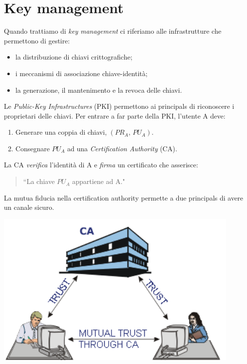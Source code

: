 \documentclass[a4paper, 11pt, twoside, openright, fleqn]{report}
\begin{document}
\chapter{Key management}
Quando trattiamo di \emph{key management} ci riferiamo alle infrastrutture che permettono di gestire:
\begin{itemize}
	\item la distribuzione di chiavi crittografiche;
	\item i meccanismi di associazione chiave-identità;
	\item la generazione, il mantenimento e la revoca delle chiavi.
\end{itemize}
Le \emph{Public-Key Infrastructures} (PKI) permettono ai principals di riconoscere i proprietari delle chiavi. Per entrare a far parte della PKI, l'utente A deve:
\begin{enumerate}
	\item Generare una coppia di chiavi, $(PR_A,\,PU_A)$.
	\item Consegnare $PU_A$ ad una \emph{Certification Authority} (CA).
\end{enumerate}
La CA \emph{verifica} l'identità di A e \emph{firma} un certificato che asserisce:
\begin{quote}
	``La chiave $PU_A$ appartiene ad A."
\end{quote}
\begin{minipage}{.62\textwidth}
	\noindent La mutua fiducia nella certification authority permette a due principals di avere un canale sicuro.
\end{minipage}
\begin{minipage}{.38\textwidth}
	\centering
	\includegraphics[width=.9\textwidth]{images/CAMutualTrust}
\end{minipage}
\end{document}
